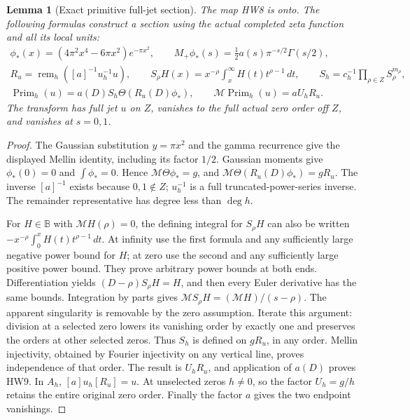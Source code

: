 \documentclass[11pt,a4paper]{article}
\newtheorem{lemma}[theorem]{Lemma}
\theoremstyle{definition}\newtheorem{definition}[theorem]{Definition}
\newcommand{\B}{\mathbb B}\newcommand{\N}{\mathbb N}
\providecommand{\rem}{\operatorname{rem}}
\providecommand{\M}{\mathcal M}
\begin{document}
\begin{lemma}[Exact primitive full-jet section]\label{hw:sectionlemma}
The map HW8 is onto. The following formulas construct a section
using the actual completed zeta function and all its local units:
\[
 \begin{gathered}
 \phi_*(x)=(4\pi^2x^4-6\pi x^2)e^{-\pi x^2},\qquad
 M_+\phi_*(s)=\tfrac12a(s)\pi^{-s/2}\Gamma(s/2),\\
 R_u=\rem_h([a]^{-1}u_h^{-1}u),\qquad
 S_\rho H(x)=x^{-\rho}\int_x^\infty H(t)t^{\rho-1}\,dt,\qquad
 S_h=c_h^{-1}\prod_{\rho\in Z}S_\rho^{m_\rho},\\
 \operatorname{Prim}_h(u)
       =a(D)S_h\Theta(R_u(D)\phi_*),\qquad
 \M\operatorname{Prim}_h(u)=aU_hR_u.
 \end{gathered}
 \tag{HW9}\label{hw:primitive}
\]
The transform has full jet \(u\) on \(Z\), vanishes to the full
actual zero order off \(Z\), and vanishes at \(s=0,1\).
\end{lemma}
\begin{proof}
The Gaussian substitution \(y=\pi x^2\) and the gamma recurrence
give the displayed Mellin identity, including its factor \(1/2\).
Gaussian moments give \(\phi_*(0)=0\) and \(\int\phi_*=0\).
Hence \(\M\Theta\phi_*=g\), and
\(\M\Theta(R_u(D)\phi_*)=gR_u\).
The inverse \([a]^{-1}\) exists because \(0,1\notin Z\);
\(u_h^{-1}\) is a full truncated-power-series inverse.
The remainder representative has degree less than \(\deg h\).

For \(H\in\B\) with \(\M H(\rho)=0\), the defining integral
for \(S_\rho H\) can also be written
\(-x^{-\rho}\int_0^xH(t)t^{\rho-1}\,dt\).
At infinity use the first formula and any sufficiently large
negative power bound for \(H\); at zero use the second and any
sufficiently large positive power bound. They prove arbitrary
power bounds at both ends. Differentiation yields
\((D-\rho)S_\rho H=H\), and then every Euler derivative has
the same bounds. Integration by parts gives
\(\M S_\rho H=(\M H)/(s-\rho)\).
The apparent singularity is removable by the zero assumption.
Iterate this argument: division at a selected zero lowers its
vanishing order by exactly one and preserves the orders at other
selected zeros. Thus \(S_h\) is defined on \(gR_u\), in any order.
Mellin injectivity, obtained by Fourier injectivity on any vertical
line, proves independence of that order.
The result is \(U_hR_u\), and application of \(a(D)\) proves HW9.
In \(A_h\), \([a]u_h[R_u]=u\). At unselected zeros \(h\ne0\),
so the factor \(U_h=g/h\) retains the entire original zero order.
Finally the factor \(a\) gives the two endpoint vanishings.
\end{proof}
\end{document}
